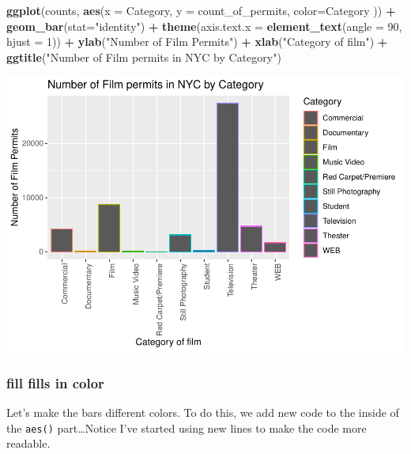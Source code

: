 \documentclass[]{book}
\newenvironment{Shaded}{\begin{snugshade}}{\end{snugshade}}
\newcommand{\KeywordTok}[1]{\textcolor[rgb]{0.13,0.29,0.53}{\textbf{#1}}}
\newcommand{\DataTypeTok}[1]{\textcolor[rgb]{0.13,0.29,0.53}{#1}}
\newcommand{\DecValTok}[1]{\textcolor[rgb]{0.00,0.00,0.81}{#1}}
\newcommand{\StringTok}[1]{\textcolor[rgb]{0.31,0.60,0.02}{#1}}
\newcommand{\OperatorTok}[1]{\textcolor[rgb]{0.81,0.36,0.00}{\textbf{#1}}}
\newcommand{\NormalTok}[1]{#1}
\begin{document}
\begin{Shaded}
\begin{Highlighting}[]
\KeywordTok{ggplot}\NormalTok{(counts, }\KeywordTok{aes}\NormalTok{(}\DataTypeTok{x =}\NormalTok{ Category, }\DataTypeTok{y =}\NormalTok{ count_of_permits, }\DataTypeTok{color=}\NormalTok{Category )) }\OperatorTok{+}
\StringTok{  }\KeywordTok{geom_bar}\NormalTok{(}\DataTypeTok{stat=}\StringTok{"identity"}\NormalTok{) }\OperatorTok{+}\StringTok{ }
\StringTok{  }\KeywordTok{theme}\NormalTok{(}\DataTypeTok{axis.text.x =} \KeywordTok{element_text}\NormalTok{(}\DataTypeTok{angle =} \DecValTok{90}\NormalTok{, }\DataTypeTok{hjust =} \DecValTok{1}\NormalTok{)) }\OperatorTok{+}
\StringTok{  }\KeywordTok{ylab}\NormalTok{(}\StringTok{"Number of Film Permits"}\NormalTok{) }\OperatorTok{+}\StringTok{ }
\StringTok{  }\KeywordTok{xlab}\NormalTok{(}\StringTok{"Category of film"}\NormalTok{) }\OperatorTok{+}
\StringTok{  }\KeywordTok{ggtitle}\NormalTok{(}\StringTok{"Number of Film permits in NYC by Category"}\NormalTok{)}
\end{Highlighting}
\end{Shaded}

\includegraphics{Statistics_Lab_files/figure-latex/1categoryF-1.pdf}

\subsubsection{fill fills in color}\label{fill-fills-in-color}

Let's make the bars different colors. To do this, we add new code to the
inside of the \texttt{aes()} part\ldots{}Notice I've started using new
lines to make the code more readable.
\end{document}
